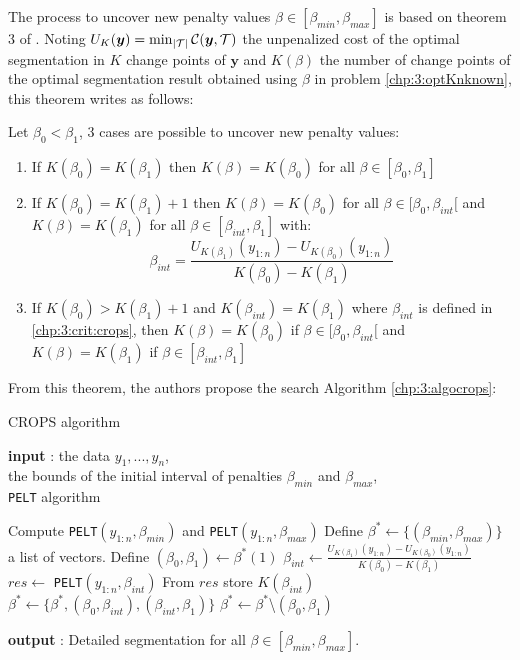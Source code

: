 The process to uncover new penalty values $\beta \in [\beta_{min},\beta_{max}]$ is based on theorem 3 of \cite{haynes2017}. Noting $U_K(\bm y) = \min_{\lvert{\mathcal T}\rvert} {\mathcal C}(\bm y,{\mathcal T})$ the unpenalized cost of the optimal segmentation in $K$ change points of $\bm y$ and $K(\beta)$ the number of change points of the optimal segmentation result obtained using $\beta$ in problem \eqref{chp:3:optKnknown}, this theorem writes as follows:

\begin{theorem}
Let $\beta_0 < \beta_1$, 3 cases are possible to uncover new penalty values:
\begin{enumerate}
  \item If $K(\beta_0) = K(\beta_1)$ then $K(\beta) = K(\beta_0)$ for all $\beta \in [\beta_0,\beta_1]$
  \item If $K(\beta_0) = K(\beta_1)+1$ then $K(\beta) = K(\beta_0)$ for all $\beta\in[\beta_0,\beta_{int}[$ and $K(\beta) = K(\beta_1)$ for all $\beta\in[\beta_{int},\beta_1]$ with:
  \begin{equation}\label{chp:3:crit:crops}
    \beta_{int} = \frac{U_{K(\beta_1)}(y_{1:n})-U_{K(\beta_0)}(y_{1:n})}{K(\beta_0)-K(\beta_1)}
  \end{equation}
  \item If $K(\beta_0) > K(\beta_1)+1$ and $K(\beta_{int}) = K(\beta_1)$ where $\beta_{int}$ is defined in \eqref{chp:3:crit:crops}, then $K(\beta) = K(\beta_0)$ if $\beta\in[\beta_0,\beta_{int}[$ and $K(\beta) = K(\beta_1)$ if $\beta\in [\beta_{int},\beta_1]$
\end{enumerate}
\end{theorem} 

From this theorem, the authors propose the search Algorithm \ref{chp:3:algocrops}:

\begin{algorithm}[ht]
\caption{CROPS algorithm}\label{chp:3:algocrops}
\begin{algorithmic}

\State \textbf{input} : the data $y_{1},...,y_{n}$, \\
the bounds of the initial interval of penalties $\beta_{min}$ and $\beta_{max}$, \\
\texttt{PELT} algorithm 
  
\State Compute \texttt{PELT}$(y_{1:n},\beta_{min})$ and \texttt{PELT}$(y_{1:n},\beta_{max})$ 
\State Define $\beta^* \gets \{(\beta_{min},\beta_{max})\}$ a list of vectors.  
\While{$\beta^*\neq \emptyset$}
  \State Define $(\beta_0, \beta_1) \gets \beta^*(1)$
    \State $\beta_{int} \gets \frac{U_{K(\beta_1)}(y_{1:n})-U_{K(\beta_0)}(y_{1:n})}{K(\beta_0)-K(\beta_1)}$
    \State $res \gets$ \texttt{PELT}$(y_{1:n},\beta_{int})$
    \State From $res$ store $K(\beta_{int})$
      \State $\beta^* \gets \{\beta^*,(\beta_0,\beta_{int}),(\beta_{int},\beta_1)\}$
    \EndIf
  \EndIf
  \State $\beta^* \gets \beta^*$\textbackslash$(\beta_0,\beta_1)$
\EndWhile 
   
\State \textbf{output} : Detailed segmentation for all $\beta \in [\beta_{min},\beta_{max}]$. 
\end{algorithmic}
\end{algorithm} 

